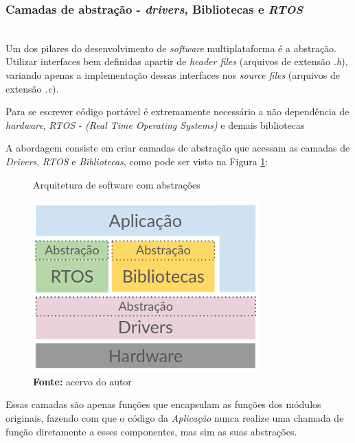 \documentclass[times, twoside, watermark]{artigo}
\begin{document}
\subsubsection{Camadas de abstração - \textit{drivers}, Bibliotecas e \textit{RTOS}}\hfill\\

Um dos pilares do desenvolvimento de \textit{software} multiplataforma é a abstração.
Utilizar interfaces bem definidas apartir de \textit{header files} (arquivos de 
extensão \textit{.h}), variando apenas a implementação dessas interfaces nos 
\textit{source files} (arquivos de extensão \textit{.c}).

Para se escrever código portável é extremamente necessário a não dependência de 
\textit{hardware}, \textit{RTOS - (Real Time Operating Systems)} e demais bibliotecas

A abordagem consiste em criar camadas de abstração que acessam as camadas de 
\textit{Drivers}, \textit{RTOS} e \textit{Bibliotecas}, como pode ser visto na Figura 
\ref{fig:arch-abs}:\hfill\\

\begin{figure}[H]
    \centering
    \caption{Arquitetura de software com abstrações}
    \includegraphics[width=0.9\linewidth]{images/arch-abs.png}
    \caption*{\newline\textbf{Fonte:} acervo do autor}
    \label{fig:arch-abs}
\end{figure}


Essas camadas são apenas funções que encapsulam as funções dos módulos originais, 
fazendo com que o código da \textit{Aplicação} nunca realize uma chamada de função 
diretamente a esses componentes, mas sim as suas abstrações.
\end{document}
